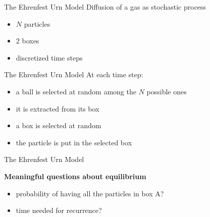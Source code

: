 \begin{frame}{The Ehrenfest Urn Model} %
    Diffusion of a gas as \alert{stochastic process}
    \begin{itemize}
      \item $N$ particles
      \item 2 boxes
      \item discretized time steps
    \end{itemize}
   
    \begin{figure}
      \begin{center}
        
      \end{center}
    \end{figure}

  \end{frame}

  \begin{frame}{The Ehrenfest Urn Model}
    At each time step:
    \begin{itemize}
      \item<1-> \alert<1>{a ball is selected at random among the $N$ possible ones}
      \item<2-> \alert<2>{it is extracted from its box}
      \item<3-> \alert<3>{a box is selected at random}
      \item<4-> \alert<4>{the particle is put in the selected box}
    \end{itemize}

    \medskip
        \begin{figure}[b]
        \begin{center}
        \end{center}
        \end{figure}
  \end{frame}

  \begin{frame}{The Ehrenfest Urn Model}
    \begin{center}
      \textbf{Meaningful questions about equilibrium}
    \end{center}
    \begin{itemize}
      \item probability of having all the particles in box A?
    \end{itemize}
    \begin{figure}
      
    \end{figure}
    \begin{itemize}
      \item time needed for recurrence?
    \end{itemize}
    \begin{figure}
      
    \end{figure}
  \end{frame}
